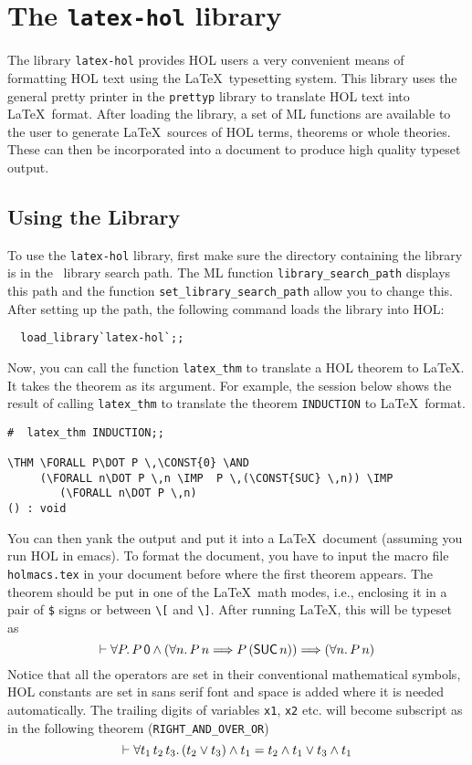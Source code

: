 \chapter{The {\tt latex-hol} library}
  
The library {\tt latex-hol} provides HOL users a very convenient means of
formatting HOL text using the \LaTeX\ typesetting system. This library
uses the general pretty printer in the {\tt prettyp} library to
translate HOL text into \LaTeX\ format. After loading the library, a
set of ML functions are available to the user to
generate \LaTeX\ sources of HOL terms, theorems or whole theories. These
can then be incorporated into a document to produce high quality
typeset output.  

\section{Using the Library}

To use the {\tt latex-hol} library, first make sure the directory
containing the library is in the \HOL\ library search path. The ML
function {\tt library\_search\_path} displays this path and the
function {\tt set\_library\_search\_path} allow you to change this.
After setting up the path, the following command loads the
library into HOL:
\begin{verbatim}
  load_library`latex-hol`;;
\end{verbatim}
Now, you can call the function {\tt latex\_thm} to translate a HOL theorem
to \LaTeX. It takes the theorem as its argument. For
example, the session below shows the result of calling {\tt latex\_thm}
to translate the theorem {\tt INDUCTION} to \LaTeX\ format. 
\setcounter{sessioncount}{1}
\begin{session}\begin{verbatim}
#  latex_thm INDUCTION;;

\THM \FORALL P\DOT P \,\CONST{0} \AND 
     (\FORALL n\DOT P \,n \IMP  P \,(\CONST{SUC} \,n)) \IMP 
        (\FORALL n\DOT P \,n)
() : void
\end{verbatim}\end{session}
You can then yank the output and put it into a \LaTeX\ document
(assuming you run HOL in emacs). To format the document, you have to
input the macro file {\tt holmacs.tex} in your document before where
the first theorem appears. The theorem should be put in one of the
\LaTeX\ math modes, i.e., enclosing it in a pair of {\tt \$} signs or
between \verb|\[| and \verb|\]|. After running \LaTeX, this will be
typeset as 
\[\THM \FORALL P\DOT P \,\CONST{0} \AND 
               (\FORALL n\DOT P \,n \IMP  P \,(\CONST{SUC} \,n)) \IMP 
                      (\FORALL n\DOT P \,n)
\]
Notice that all the operators are set in their conventional
mathematical symbols, HOL constants are set in {\constfont sans serif}
font and space is added where it is needed automatically.  The
trailing digits of variables {\tt x1}, {\tt x2} etc. will 
become subscript as in the following theorem ({\tt RIGHT\_AND\_OVER\_OR})
\[
\THM \FORALL t_{1} \,t_{2} \,t_{3}\DOT
        (t_{2} \OR  t_{3}) \AND  t_{1} =
           t_{2} \AND  t_{1} \OR  t_{3} \AND  t_{1}
\]

